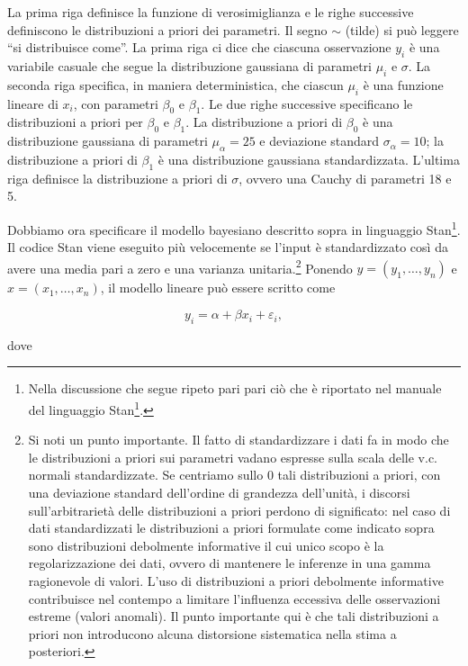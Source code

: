 \documentclass[
  11pt,
]{krantz}
\renewcommand{\href}[2]{#2\footnote{\url{#1}}}
\theoremstyle{definition}
\theoremstyle{definition}
\theoremstyle{definition}
\theoremstyle{definition}
\theoremstyle{remark}
\begin{document}
La prima riga definisce la funzione di verosimiglianza e le righe successive definiscono le distribuzioni a priori dei parametri. Il segno \(\sim\) (tilde) si può leggere ``si distribuisce come''. La prima riga ci dice che ciascuna osservazione \(y_i\) è una variabile casuale che segue la distribuzione gaussiana di parametri \(\mu_i\) e \(\sigma\). La seconda riga specifica, in maniera deterministica, che ciascun \(\mu_i\) è una funzione lineare di \(x_i\), con parametri \(\beta_0\) e \(\beta_1\). Le due righe successive specificano le distribuzioni a priori per \(\beta_0\) e \(\beta_1\). La distribuzione a priori di \(\beta_0\) è una distribuzione gaussiana di parametri \(\mu_{\alpha} = 25\) e deviazione standard \(\sigma_{\alpha} = 10\); la distribuzione a priori di \(\beta_1\) è una distribuzione gaussiana standardizzata. L'ultima riga definisce la distribuzione a priori di \(\sigma\), ovvero una Cauchy di parametri 18 e 5.

Dobbiamo ora specificare il modello bayesiano descritto sopra in linguaggio Stan\footnote{Nella discussione che segue ripeto pari pari ciò che è riportato nel manuale del linguaggio \href{https://mc-stan.org/docs/2_27/stan-users-guide/standardizing-predictors-and-outputs.html}{Stan}.}. Il codice Stan viene eseguito più velocemente se l'input è standardizzato così da avere una media pari a zero e una varianza unitaria.\footnote{Si noti un punto importante. Il fatto di standardizzare i dati fa in modo che le distribuzioni a priori sui parametri vadano espresse sulla scala delle v.c. normali standardizzate. Se centriamo sullo 0 tali distribuzioni a priori, con una deviazione standard dell'ordine di grandezza dell'unità, i discorsi sull'arbitrarietà delle distribuzioni a priori perdono di significato: nel caso di dati standardizzati le distribuzioni a priori formulate come indicato sopra sono distribuzioni debolmente informative il cui unico scopo è la regolarizzazione dei dati, ovvero di mantenere le inferenze in una gamma ragionevole di valori. L'uso di distribuzioni a priori debolmente informative contribuisce nel contempo a limitare l'influenza eccessiva delle osservazioni estreme (valori anomali). Il punto importante qui è che tali distribuzioni a priori non introducono alcuna distorsione sistematica nella stima a posteriori.} Ponendo \(y = (y_1, \dots, y_n)\) e \(x = (x_1, \dots, x_n)\), il modello lineare può essere scritto come

\[
y_i = \alpha + \beta x_i + \varepsilon_i,
\]

dove
\end{document}
